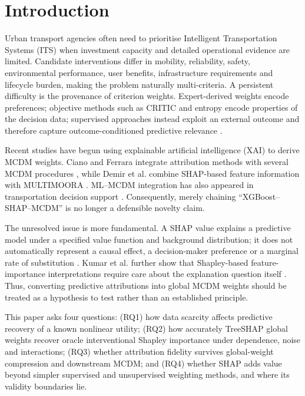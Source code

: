 \documentclass[runningheads]{llncs}
\begin{document}
\section{Introduction}
\label{sec:intro}

Urban transport agencies often need to prioritise Intelligent Transportation Systems (ITS)
when investment capacity and detailed operational evidence are limited. Candidate
interventions differ in mobility, reliability, safety, environmental performance, user
benefits, infrastructure requirements and lifecycle burden, making the problem naturally
multi-criteria. A persistent difficulty is the provenance of criterion weights. Expert-derived
weights encode preferences; objective methods such as CRITIC and entropy encode properties of
the decision data; supervised approaches instead exploit an external outcome and therefore
capture outcome-conditioned predictive relevance \cite{diakoulaki1995critic,shannon1948}.

Recent studies have begun using explainable artificial intelligence (XAI) to derive MCDM
weights. Ciano and Ferrara integrate attribution methods with several MCDM procedures
\cite{ciano2025xaimcdm}, while Demir et al. combine SHAP-based feature information with
MULTIMOORA \cite{demir2025shapmultimoora}. ML--MCDM integration has also appeared in
transportation decision support \cite{zakeri2024mlmcdm}. Consequently, merely chaining
``XGBoost--SHAP--MCDM'' is no longer a defensible novelty claim.

The unresolved issue is more fundamental. A SHAP value explains a predictive model under a
specified value function and background distribution; it does not automatically represent a
causal effect, a decision-maker preference or a marginal rate of substitution
\cite{janzing2020causal,aas2021dependent}. Kumar et al. further show that Shapley-based
feature-importance interpretations require care about the explanation question itself
\cite{kumar2020shapleyproblems}. Thus, converting predictive attributions into global MCDM
weights should be treated as a hypothesis to test rather than an established principle.

This paper asks four questions: (RQ1) how data scarcity affects predictive recovery of a known
nonlinear utility; (RQ2) how accurately TreeSHAP global weights recover oracle interventional
Shapley importance under dependence, noise and interactions; (RQ3) whether attribution
fidelity survives global-weight compression and downstream MCDM; and (RQ4) whether SHAP adds
value beyond simpler supervised and unsupervised weighting methods, and where its validity
boundaries lie.
\end{document}
